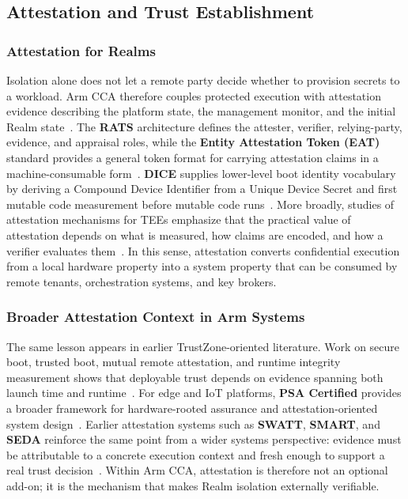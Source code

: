 \subsection{Attestation and Trust Establishment}

\subsubsection{Attestation for Realms}

Isolation alone does not let a remote party decide whether to provision secrets to a workload. Arm CCA therefore couples protected execution with attestation evidence describing the platform state, the management monitor, and the initial Realm state~\cite{arm_cca_spec,arm_rmm_spec}. The \textbf{RATS} architecture defines the attester, verifier, relying-party, evidence, and appraisal roles, while the \textbf{Entity Attestation Token (EAT)} standard provides a general token format for carrying attestation claims in a machine-consumable form~\cite{rats_rfc,eat_rfc}. \textbf{DICE} supplies lower-level boot identity vocabulary by deriving a Compound Device Identifier from a Unique Device Secret and first mutable code measurement before mutable code runs~\cite{tcg_dice_2018}. More broadly, studies of attestation mechanisms for TEEs emphasize that the practical value of attestation depends on what is measured, how claims are encoded, and how a verifier evaluates them~\cite{menetrey2022attestation}. In this sense, attestation converts confidential execution from a local hardware property into a system property that can be consumed by remote tenants, orchestration systems, and key brokers.

\subsubsection{Broader Attestation Context in Arm Systems}

The same lesson appears in earlier TrustZone-oriented literature. Work on secure boot, trusted boot, mutual remote attestation, and runtime integrity measurement shows that deployable trust depends on evidence spanning both launch time and runtime~\cite{ling2021trustzoneatt,chen2024mraima,mao2025pdrima}. For edge and IoT platforms, \textbf{PSA Certified} provides a broader framework for hardware-rooted assurance and attestation-oriented system design~\cite{psa_certified}. Earlier attestation systems such as \textbf{SWATT}, \textbf{SMART}, and \textbf{SEDA} reinforce the same point from a wider systems perspective: evidence must be attributable to a concrete execution context and fresh enough to support a real trust decision~\cite{seshadri2004swatt,defrawy2012smart,asokan2015seda}. Within Arm CCA, attestation is therefore not an optional add-on; it is the mechanism that makes Realm isolation externally verifiable.

